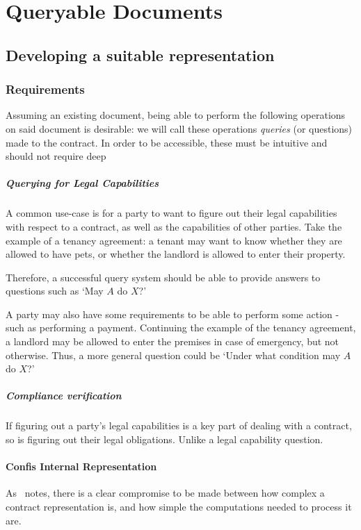 \chapter{Queryable Documents}\label{ch:queries}

\section{Developing a suitable representation}\label{sec:queries-representation}

\subsection{Requirements}\label{subsec:queries-requirements}

Assuming an existing document, being able to perform the following operations on said document is desirable: we will call these operations \emph{queries} (or questions) made to the contract.
In order to be accessible, these must be intuitive and should not require deep

\paragraph{Querying for Legal Capabilities} A common use-case is for a party to want to figure out their legal capabilities with respect to a contract, as well as the capabilities of other parties.
Take the example of a tenancy agreement: a tenant may want to know whether they are allowed to have pets, or whether the landlord is allowed to enter their property.

Therefore, a successful query system should be able to provide answers to questions such as `May $A$ do $X$?'

A party may also have some requirements to be able to perform some action - such as performing a payment.
Continuing the example of the tenancy agreement, a landlord may be allowed to enter the premises in case of emergency, but not otherwise.
Thus, a more general question could be `Under what condition may $A$ do $X$?'

\paragraph{Compliance verification} If figuring out a party's legal capabilities is a key part of dealing with a contract, so is figuring out their legal obligations.
Unlike a legal capability question.


\subsubsection{Confis Internal Representation}
As~\cite{knottenbeltContractDriven} notes, there is a clear compromise to be made between how complex a contract representation is, and how simple the computations needed to process it are.

